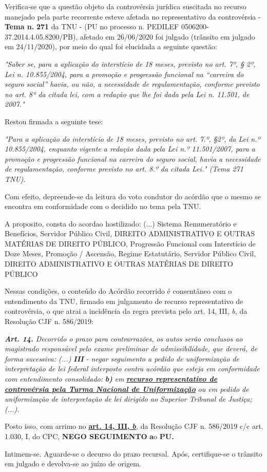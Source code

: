 \documentclass[12pt]{article}
\begin{document}
\justifying
\noindent Verifica-se que a questão objeto da controvérsia jurídica suscitada no recurso manejado pela parte recorrente esteve afetada no representativo da controvérsia - \textbf{Tema n. }\textbf{271} da TNU - (PU no processo n. PEDILEF 0506200-37.2014.4.05.8200/PB),  afetado em 26/06/2020 foi julgado (trânsito em julgado em 24/11/2020), por meio do qual foi elucidada a seguinte questão:

\noindent \textit{"Saber se, para a aplicação do interstício de 18 meses, previsto no art. 7º, § 2º, Lei n. 10.855/2004, para a promoção e progressão funcional na “carreira do seguro social” havia, ou não, a necessidade de regulamentação, conforme previsto no art. 8º da citada lei, com a redação que lhe foi dada pela Lei n. 11.501, de 2007."}

\noindent Restou firmada a seguinte tese:

\noindent \textit{"Para a aplicação do interstício de 18 meses, previsto no art. 7.º, §2º, da Lei n.º 10.855/2004, enquanto vigente a redação dada pela Lei n.º 11.501/2007, para a promoção e progressão funcional na carreira do seguro social, havia a necessidade de regulamentação, conforme previsto no art. 8.º da citada Lei." (Tema 271 TNU).}

\noindent Com efeito, depreende-se da leitura do voto condutor do acórdão que o mesmo se encontra em conformidade com o decidido no  tema pela TNU.

\noindent A proposito, consta do acordao hostilizado: (...) Sistema Remuneratório e Benefícios, Servidor Público Civil, DIREITO ADMINISTRATIVO E OUTRAS MATÉRIAS DE DIREITO PÚBLICO, Progressão Funcional com Interstício de Doze Meses, Promoção / Ascensão, Regime Estatutário, Servidor Público Civil, DIREITO ADMINISTRATIVO E OUTRAS MATÉRIAS DE DIREITO PÚBLICO

\noindent Nessas condições, o conteúdo do Acórdão recorrido é consentâneo com o entendimento da TNU, firmado em julgamento de recurso representativo de controvérsia, o que atrai a incidência da regra prevista pelo art. 14, III, \textit{b,} da Resolução CJF n. 586/2019:

\noindent \textit{\textbf{Art. 14.}}\textit{ Decorrido o prazo para contrarrazões, os autos serão conclusos ao magistrado responsável pelo exame preliminar de admissibilidade, que deverá, de forma sucessiva: (...) }\textit{\textbf{III }}\textit{- negar seguimento a pedido de uniformização de interpretação de lei federal interposto contra acórdão que esteja em conformidade com entendimento consolidado: }\textit{\textbf{b)}}\textit{ em }\uline{\textit{\textbf{recurso representativo de controvérsia pela Turma Nacional de Uniformização}}}\textit{ ou em pedido de uniformização de interpretação de lei dirigido ao Superior Tribunal de Justiça;(...).}

\noindent Posto isso, com arrimo no \uline{\textbf{art. 14, III, }}\uline{\textit{\textbf{b}}}\textit{,} da Resolução CJF n. 586/2019 c/c art. 1.030, I, do CPC, \textbf{NEGO SEGUIMENTO }\textbf{a}o\textbf{ PU}\textbf{.}

\noindent Intimem-se. Aguarde-se o decurso do prazo recursal. Após, certifique-se o trânsito em julgado e devolva-se ao juízo de origem.
\end{document}
